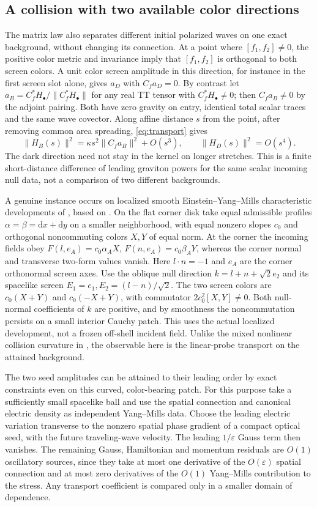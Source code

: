 \documentclass[11pt]{article}
\newcommand{\dd}{\mathrm d}
\newcommand{\eps}{\varepsilon}
\begin{document}
\subsection{A collision with two available color directions}
The matrix law also separates different initial polarized waves on one exact background, without changing its connection. At a point where \([f_1,f_2]\ne0\), the positive color metric and invariance imply that \([f_1,f_2]\) is orthogonal to both screen colors. A unit color screen amplitude in this direction, for instance in the first screen slot alone, gives \(a_D\) with \(C_fa_D=0\). By contrast let \(a_B=C_f^*H_\bullet/\|C_f^*H_\bullet\|\) for any real TT tensor with \(C_f^*H_\bullet\ne0\); then \(C_fa_B\ne0\) by the adjoint pairing. Both have zero gravity on entry, identical total scalar traces and the same wave covector. Along affine distance \(s\) from the point, after removing common area spreading, \eqref{eq:transport} gives
\[
 \|H_B(s)\|^2=\kappa s^2\|C_fa_B\|^2+O(s^3),\qquad
 \|H_D(s)\|^2=O(s^4).
\]
The dark direction need not stay in the kernel on longer stretches. This is a finite short-distance difference of leading graviton powers for the same scalar incoming null data, not a comparison of two different backgrounds.

A genuine instance occurs on localized smooth Einstein--Yang--Mills characteristic developments of \cite{p43}, based on \cite{my}. On the flat corner disk take equal admissible profiles \(\alpha=\beta=\dd x+\dd y\) on a smaller neighborhood, with equal nonzero slopes \(c_0\) and orthogonal noncommuting colors \(X,Y\) of equal norm. At the corner the incoming fields obey \(F(l,e_A)=c_0\alpha_A X\), \(F(n,e_A)=c_0\beta_A Y\), whereas the corner normal and transverse two-form values vanish. Here \(l\cdot n=-1\) and \(e_A\) are the corner orthonormal screen axes. Use the oblique null direction \(k=l+n+\sqrt2e_2\) and its spacelike screen \(E_1=e_1,E_2=(l-n)/\sqrt2\). The two screen colors are \(c_0(X+Y)\) and \(c_0(-X+Y)\), with commutator \(2c_0^2[X,Y]\ne0\). Both null-normal coefficients of \(k\) are positive, and by smoothness the noncommutation persists on a small interior Cauchy patch. This uses the actual localized development, not a frozen off-shell incident field. Unlike the mixed nonlinear collision curvature in \cite{p43}, the observable here is the linear-probe transport on the attained background.

The two seed amplitudes can be attained to their leading order by exact constraints even on this curved, color-bearing patch. For this purpose take a sufficiently small spacelike ball and use the spatial connection and canonical electric density as independent Yang--Mills data. Choose the leading electric variation transverse to the nonzero spatial phase gradient of a compact optical seed, with the future traveling-wave velocity. The leading \(1/\eps\) Gauss term then vanishes. The remaining Gauss, Hamiltonian and momentum residuals are \(O(1)\) oscillatory sources, since they take at most one derivative of the \(O(\eps)\) spatial connection and at most zero derivatives of the \(O(1)\) Yang--Mills contribution to the stress. Any transport coefficient is compared only in a smaller domain of dependence.
\end{document}
